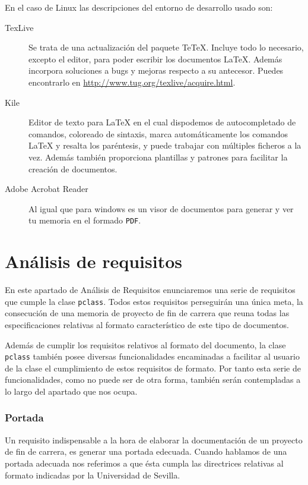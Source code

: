 En el caso de Linux las descripciones del entorno de desarrollo usado son:

\begin{description}
		\item[TexLive] Se trata de una actualizaci\'on del paquete Te\TeX{}. Incluye todo lo necesario, excepto 
									el editor, para poder escribir los documentos \LaTeX{}. Adem\'as incorpora soluciones a bugs y 
									mejoras respecto a su antecesor. Puedes encontrarlo en \url{http://www.tug.org/texlive/acquire.html}. 
		
		\item[Kile] Editor de texto para \LaTeX{} en el cual dispodemos de autocompletado de comandos, coloreado de sintaxis,
		 						marca autom\'aticamente los comandos \LaTeX{} y resalta los par\'entesis, y puede trabajar
		 						con m\'ultiples ficheros a la vez. Adem\'as tambi\'en proporciona plantillas y patrones para facilitar 
								la creaci\'on de documentos.
		
		\item[Adobe Acrobat Reader] Al igual que para windows es un visor de documentos para generar y ver tu memoria en el 
																formado \texttt{PDF}.
		
\end{description}




\section{An\'alisis de requisitos}
En este apartado de An\'alisis de Requisitos enunciaremos una serie de requisitos que cumple la clase \texttt{pclass}.
Todos estos requisitos perseguir\'an una \'unica meta, la consecuci\'on de una memoria de proyecto de fin de carrera 
que reuna todas las especificaciones relativas al formato caracter\'istico de este tipo de documentos.

Adem\'as de cumplir los requisitos relativos al formato del documento, la clase \texttt{pclass} tambi\'en posee
diversas funcionalidades encaminadas a facilitar al usuario de la clase el cumplimiento de estos requisitos de 
formato. Por tanto esta serie de funcionalidades, como no puede ser de otra forma, tambi\'en ser\'an contempladas a lo 
largo del apartado que nos ocupa.

\subsubsection{Portada}
Un requisito indispensable a la hora de elaborar la documentaci\'on de un proyecto de fin de carrera, es generar una
portada edecuada. Cuando hablamos de una portada adecuada nos referimos a que \'esta cumpla las directrices relativas
al formato indicadas por la Universidad de Sevilla.

